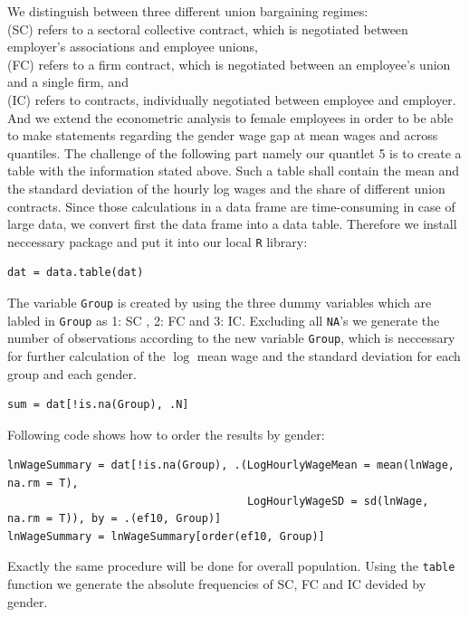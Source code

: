 We distinguish between three different union bargaining regimes:\\
\noindent\hspace*{6mm} (SC) refers to a sectoral collective contract, which is negotiated between employer's associations and employee unions,\\
\noindent\hspace*{6mm} (FC) refers to a firm contract, which is negotiated between an employee's union and a single firm, and\\
\noindent\hspace*{6mm} (IC) refers to contracts, individually negotiated between employee and employer. And we extend the econometric analysis to female employees in order to be able to make statements regarding the gender wage gap at mean wages and across quantiles. The challenge of the following part namely our quantlet 5 is to create a table with the information stated above. Such a table shall contain the mean and the standard deviation  of the hourly log wages and the share of different union contracts.
Since those calculations in a data frame are time-consuming in case of large data, we convert first the data frame into a data table. Therefore we install  neccessary package and put it into our local \texttt{R} library:
\lstset{firstnumber = 319} 
\begin{lstlisting}
dat = data.table(dat)             
\end{lstlisting}
The variable \texttt{Group} is created by using the three dummy variables which are labled in \texttt{Group} as 1: SC , 2: FC and 3: IC. Excluding all \texttt{NA}'s we generate the number of observations according to the new variable \texttt{Group}, which is neccessary for further calculation of the $\log$ mean wage and the standard deviation for each group and each gender.
\lstset{firstnumber = 330} 
\begin{lstlisting}
sum = dat[!is.na(Group), .N]                                 
\end{lstlisting}
Following code shows how to order the results by gender:
\lstset{firstnumber = 333} 
\begin{lstlisting}
lnWageSummary = dat[!is.na(Group), .(LogHourlyWageMean = mean(lnWage, na.rm = T),         
                                     LogHourlyWageSD = sd(lnWage, na.rm = T)), by = .(ef10, Group)]  
lnWageSummary = lnWageSummary[order(ef10, Group)]                                   
\end{lstlisting}
Exactly the same procedure will be done for overall population. Using the \texttt{table} function we generate the absolute frequencies of SC, FC and IC devided by gender.
